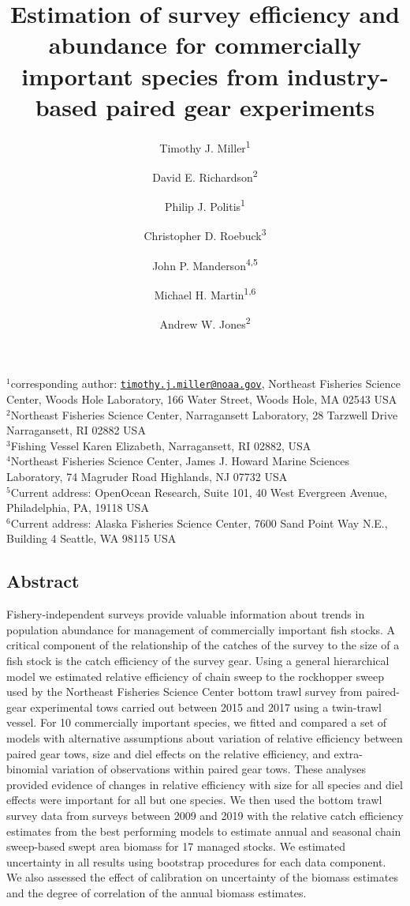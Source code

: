 \documentclass[
  12pt,
]{article}
\title{Estimation of survey efficiency and abundance for commercially
important species from industry-based paired gear experiments}
\author{Timothy J. Miller\textsuperscript{1} \and David E.
Richardson\textsuperscript{2} \and Philip J.
Politis\textsuperscript{1} \and Christopher D.
Roebuck\textsuperscript{3} \and John P.
Manderson\textsuperscript{4,5} \and Michael H.
Martin\textsuperscript{1,6} \and Andrew W. Jones\textsuperscript{2}}
\date{}
\begin{document}
\maketitle

\(^1\)corresponding author:
\href{mailto:timothy.j.miller@noaa.gov}{\nolinkurl{timothy.j.miller@noaa.gov}},
Northeast Fisheries Science Center, Woods Hole Laboratory, 166 Water
Street, Woods Hole, MA 02543 USA\\
\(^2\)Northeast Fisheries Science Center, Narragansett Laboratory, 28
Tarzwell Drive Narragansett, RI 02882 USA\\
\(^3\)Fishing Vessel Karen Elizabeth, Narragansett, RI 02882, USA\\
\(^4\)Northeast Fisheries Science Center, James J. Howard Marine
Sciences Laboratory, 74 Magruder Road Highlands, NJ 07732 USA\\
\(^5\)Current address: OpenOcean Research, Suite 101, 40 West Evergreen
Avenue, Philadelphia, PA, 19118 USA\\
\(^6\)Current address: Alaska Fisheries Science Center, 7600 Sand Point
Way N.E., Building 4 Seattle, WA 98115 USA

\pagebreak

\hypertarget{abstract}{%
\subsection*{Abstract}\label{abstract}}

Fishery-independent surveys provide valuable information about trends in
population abundance for management of commercially important fish
stocks. A critical component of the relationship of the catches of the
survey to the size of a fish stock is the catch efficiency of the survey
gear. Using a general hierarchical model we estimated relative
efficiency of chain sweep to the rockhopper sweep used by the Northeast
Fisheries Science Center bottom trawl survey from paired-gear
experimental tows carried out between 2015 and 2017 using a twin-trawl
vessel. For 10 commercially important species, we fitted and compared a
set of models with alternative assumptions about variation of relative
efficiency between paired gear tows, size and diel effects on the
relative efficiency, and extra-binomial variation of observations within
paired gear tows. These analyses provided evidence of changes in
relative efficiency with size for all species and diel effects were
important for all but one species. We then used the bottom trawl survey
data from surveys between 2009 and 2019 with the relative catch
efficiency estimates from the best performing models to estimate annual
and seasonal chain sweep-based swept area biomass for 17 managed stocks.
We estimated uncertainty in all results using bootstrap procedures for
each data component. We also assessed the effect of calibration on
uncertainty of the biomass estimates and the degree of correlation of
the annual biomass estimates.
\end{document}
